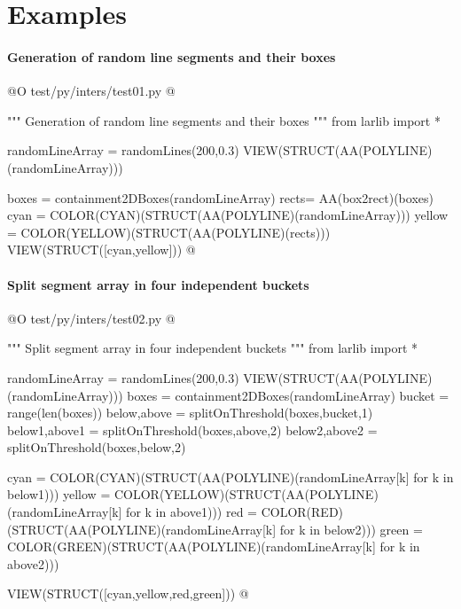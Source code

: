 \documentclass[11pt,oneside]{article}    %
\begin{document}
\section{Examples}




\paragraph{Generation of random line segments and their boxes}
@O test/py/inters/test01.py
@{""" Generation of random line segments and their boxes """
from larlib import *

randomLineArray = randomLines(200,0.3)
VIEW(STRUCT(AA(POLYLINE)(randomLineArray)))

boxes = containment2DBoxes(randomLineArray)
rects= AA(box2rect)(boxes)
cyan = COLOR(CYAN)(STRUCT(AA(POLYLINE)(randomLineArray)))
yellow = COLOR(YELLOW)(STRUCT(AA(POLYLINE)(rects)))
VIEW(STRUCT([cyan,yellow]))
@}


\paragraph{Split segment array in four independent buckets}
@O test/py/inters/test02.py
@{""" Split segment array in four independent buckets """
from larlib import *

randomLineArray = randomLines(200,0.3)
VIEW(STRUCT(AA(POLYLINE)(randomLineArray)))
boxes = containment2DBoxes(randomLineArray)
bucket = range(len(boxes))
below,above = splitOnThreshold(boxes,bucket,1)
below1,above1 = splitOnThreshold(boxes,above,2)
below2,above2 = splitOnThreshold(boxes,below,2)

cyan = COLOR(CYAN)(STRUCT(AA(POLYLINE)(randomLineArray[k] for k in below1)))
yellow = COLOR(YELLOW)(STRUCT(AA(POLYLINE)(randomLineArray[k] for k in above1)))
red = COLOR(RED)(STRUCT(AA(POLYLINE)(randomLineArray[k] for k in below2)))
green = COLOR(GREEN)(STRUCT(AA(POLYLINE)(randomLineArray[k] for k in above2)))

VIEW(STRUCT([cyan,yellow,red,green]))
@}
\end{document}
